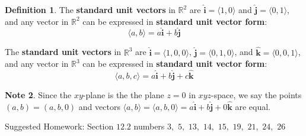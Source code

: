 \documentclass[letterpaper, twoside, 12pt]{book}
\newcommand{\<}{\langle}
\renewcommand{\>}{\rangle}
\theoremstyle{definition}
\newtheorem{theorem}{Theorem}
\theoremstyle{definition}
\newtheorem{definition}[theorem]{Definition}
\newtheorem{problem}[theorem]{Problem}
\newtheorem{note}[theorem]{Note}
\newcommand{\harpvec}[1]{\overrightharp{\ensuremath{\mathbf{#1}}}}
\newcommand*{\threevec}[3]{\ensuremath{\left\langle #1, #2, #3 \right\rangle}}
\newcommand{\veci}{\ensuremath{\mathbf{\widehat{i}}}}
\newcommand{\vecj}{\ensuremath{\mathbf{\widehat{j}}}}
\newcommand{\veck}{\ensuremath{\mathbf{\widehat{k}}}}
\begin{document}
\vfill

\begin{definition}
The \textbf{standard unit vectors} in $\mathbb{R}^2$ are
$\veci=\<1,0\>$ and $\vecj=\<0,1\>$, and any vector in $\mathbb{R}^2$
can be expressed in \textbf{standard unit vector form}:
  \[\<a,b\>=a\veci+b\vecj\]

The \textbf{standard unit vectors} in $\mathbb{R}^3$ are
$\veci=\<1,0,0\>$, $\vecj=\<0,1,0\>$, and $\veck=\<0,0,1\>$, and any vector in
$\mathbb{R}^3$ can be expressed in \textbf{standard unit vector form}:
  \[\<a,b,c\>=a\veci+b\vecj+c\veck\]
\end{definition}

\begin{note}
  Since the $xy$-plane is the the plane $z=0$ in $xyz$-space, we say the
  points $(a,b)=(a,b,0)$ and vectors $\<a,b\>=\<a,b,0\>=a\veci+b\vecj+0\veck$
  are equal.
\end{note}

\noindent Suggested Homework:
Section $12.2$ numbers $3,$ $5,$ $13,$ $14,$ $15,$ $19,$ $21,$ $24,$ $26$




\end{document}
